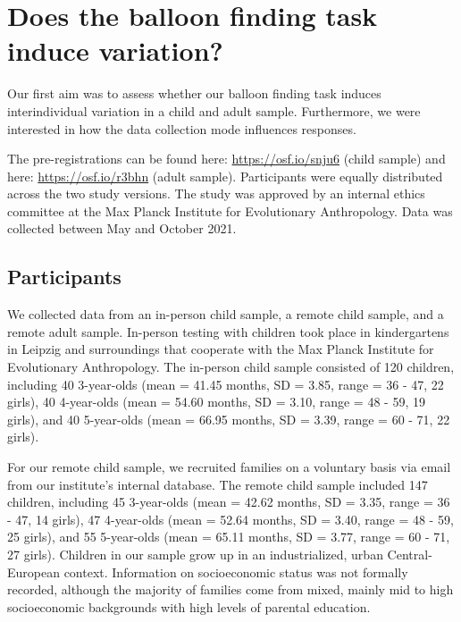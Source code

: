 \documentclass[
  man,floatsintext]{apa6}
\begin{document}
\hypertarget{does-the-balloon-finding-task-induce-variation}{%
\section{Does the balloon finding task induce variation?}\label{does-the-balloon-finding-task-induce-variation}}

Our first aim was to assess whether our balloon finding task induces interindividual variation in a child and adult sample. Furthermore, we were interested in how the data collection mode influences responses.

The pre-registrations can be found here: \url{https://osf.io/snju6} (child sample) and here: \url{https://osf.io/r3bhn} (adult sample). Participants were equally distributed across the two study versions. The study was approved by an internal ethics committee at the Max Planck Institute for Evolutionary Anthropology. Data was collected between May and October 2021.

\hypertarget{participants}{%
\subsection{Participants}\label{participants}}

We collected data from an in-person child sample, a remote child sample, and a remote adult sample.
In-person testing with children took place in kindergartens in Leipzig and surroundings that cooperate with the Max Planck Institute for Evolutionary Anthropology. The in-person child sample consisted of
120 children, including
40 3-year-olds
(mean = 41.45 months,
SD = 3.85,
range = 36
- 47,
22 girls),
40 4-year-olds
(mean = 54.60 months,
SD = 3.10,
range = 48
- 59,
19 girls),
and 40 5-year-olds
(mean = 66.95 months,
SD = 3.39,
range = 60
- 71,
22 girls).

For our remote child sample, we recruited families on a voluntary basis via email from our institute's internal database. The remote child sample included 147 children, including
45 3-year-olds
(mean = 42.62 months,
SD = 3.35,
range = 36
- 47,
14 girls),
47 4-year-olds
(mean = 52.64 months,
SD = 3.40,
range = 48
- 59,
25 girls),
and 55 5-year-olds
(mean = 65.11 months,
SD = 3.77,
range = 60
- 71,
27 girls). Children in our sample grow up in an industrialized, urban Central-European context. Information on socioeconomic status was not formally recorded, although the majority of families come from mixed, mainly mid to high socioeconomic backgrounds with high levels of parental education.
\end{document}
